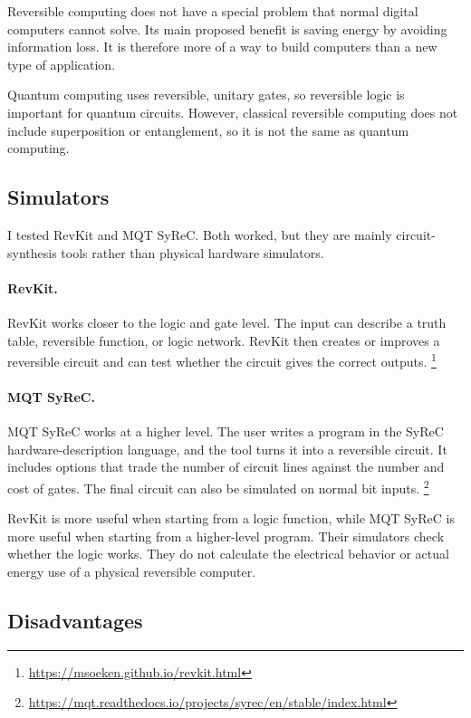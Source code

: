 \documentclass{article}
\begin{document}
Reversible computing does not have a special problem that normal digital computers cannot solve. Its main proposed benefit is saving energy by avoiding information loss. It is therefore more of a way to build computers than a new type of application.

Quantum computing uses reversible, unitary gates, so reversible logic is important for quantum circuits. However, classical reversible computing does not include superposition or entanglement, so it is not the same as quantum computing.

\subsection{Simulators}

I tested RevKit and MQT SyReC. Both worked, but they are mainly circuit-synthesis tools rather than physical hardware simulators.

\paragraph{RevKit.}
RevKit works closer to the logic and gate level. The input can describe a truth table, reversible function, or logic network. RevKit then creates or improves a reversible circuit and can test whether the circuit gives the correct outputs.
\footnote{\url{https://msoeken.github.io/revkit.html}}

\paragraph{MQT SyReC.}
MQT SyReC works at a higher level. The user writes a program in the SyReC hardware-description language, and the tool turns it into a reversible circuit. It includes options that trade the number of circuit lines against the number and cost of gates. The final circuit can also be simulated on normal bit inputs.
\footnote{\url{https://mqt.readthedocs.io/projects/syrec/en/stable/index.html}}

RevKit is more useful when starting from a logic function, while MQT SyReC is more useful when starting from a higher-level program. Their simulators check whether the logic works. They do not calculate the electrical behavior or actual energy use of a physical reversible computer.

\subsection{Disadvantages}
\end{document}
